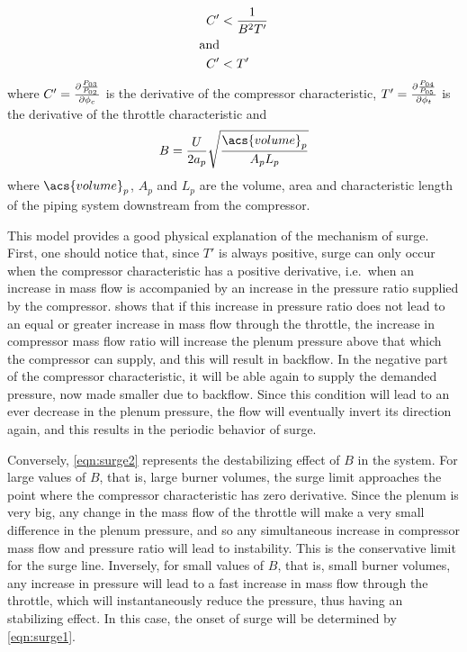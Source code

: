 \begin{align}
    C' &< \frac{1}{B^2 T'} \label{eqn:surge2} \\
\text{and} \notag \\
    C' &< T' \label{eqn:surge1}
\end{align}
where $C' = \frac{\partial \frac{P_{03}}{P_{02}}}{\partial \phi_c}$ is the derivative of the compressor characteristic, $T' = \frac{\partial \frac{P_{04}}{P_{05}}}{\partial \phi_t}$ is the derivative of the throttle characteristic and 
\begin{equation}
    B = \frac{U}{2a_p}\sqrt{\frac{\acs{volume}_p}{A_p L_p}}
\end{equation}
where $\acs{volume}_p$, $A_p$ and $L_p$ are the volume, area and characteristic length of the piping system downstream from the compressor.

This model provides a good physical explanation of the mechanism of surge. 
First, one should notice that, since $T'$ is always positive, surge can only occur when the compressor characteristic has a positive derivative, 
i.e.\ when an increase in mass flow is accompanied by an increase in the pressure ratio supplied by the compressor. 
 shows that if this increase in pressure ratio does not lead to an equal or greater increase in mass flow through the throttle, the increase in compressor mass flow ratio will increase the plenum pressure above that which the compressor can supply, and this will result in backflow. In the negative part of the compressor characteristic, it will be able again to supply the demanded pressure, now made smaller due to backflow. Since this condition will lead to an ever decrease in the plenum pressure, the flow will eventually invert its direction again, and this results in the periodic behavior of surge.

Conversely, \cref{eqn:surge2} represents the destabilizing effect of $B$ in the system.
For large values of $B$, that is, large burner volumes, the surge limit approaches the point where the compressor characteristic has zero derivative. Since the plenum is very big, any change in the mass flow of the throttle will make a very small difference in the plenum pressure, and so any simultaneous increase in compressor mass flow and pressure ratio will lead to instability. This is the conservative limit for the surge line.
Inversely, for small values of $B$, that is, small burner volumes, any increase in pressure will lead to a fast increase in mass flow through the throttle, which will instantaneously reduce the pressure, thus having an stabilizing effect. 
In this case, the onset of surge will be determined by \cref{eqn:surge1}.

